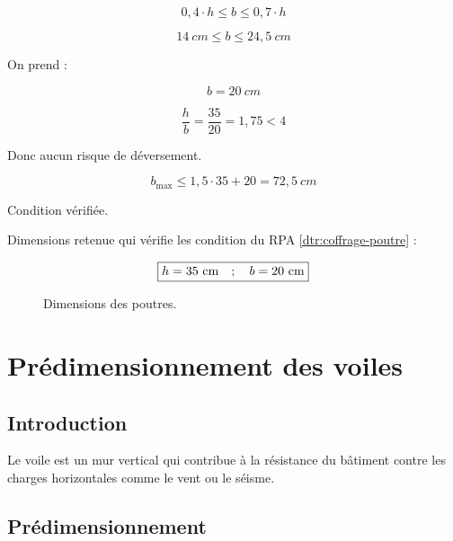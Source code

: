\documentclass[12pt,a4paper]{report}
\numberwithin{equation}{section}
\begin{document}
	\begin{equation}
		0,4 \cdot h \leq b \leq 0,7 \cdot h
	\end{equation}
	
	\[ 14 ~\unit{cm} \leq b \leq 24,5 ~\unit{cm} \]
	
	On prend :
	
	\[ b = 20 ~\unit{cm} \]
	
	\[ \dfrac{h}{b} = \dfrac{35}{20} = 1,75 < 4 \] 
	
	{\centering Donc aucun risque de déversement. \par}
	
	\[ b_{\max} \leq 1,5 \cdot 35 + 20 = 72,5 ~\unit{cm} \]
	
	{\centering Condition vérifiée. \par} 	
	
	
	
	\vspace{\baselineskip}
	
	Dimensions retenue qui vérifie les condition du RPA \eqref{dtr:coffrage-poutre} : 
	
	\[ \fbox{$h=35 ~\unit{cm} \quad ; \quad b=20 ~\unit{cm}$} \]
	
	\begin{figure}[H]
		\centering
		\caption{Dimensions des poutres.}
	\end{figure}
	
	

	
	\section{Prédimensionnement des voiles}
	
	
	\subsection{Introduction}
	
	Le voile est un mur vertical qui contribue à la résistance du bâtiment contre les charges
	horizontales comme le vent ou le séisme.
	
	\subsection{Prédimensionnement}
	
\end{document}
